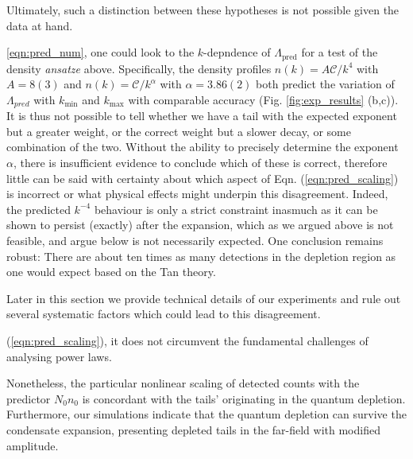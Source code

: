 	Ultimately, such a distinction between these hypotheses is not possible given the data at hand.
	
	\ref{eqn:pred_num}, one could look to the $k$-depndence of $\Lambda_\textrm{pred}$ for a test of the density \emph{ansatze} above.
	Specifically, the density profiles $n(k)=A\mathcal{C}/k^4$ with $A=8(3)$ and $n(k)=\mathcal{C}/k^{\alpha}$ with $\alpha=3.86(2)$ both predict the variation of $\Lambda_{pred}$ with $k_\textrm{min}$ and $k_\textrm{max}$ with comparable accuracy (Fig.
	\ref{fig:exp_results} (b,c)).
	It is thus not possible to tell whether we have a tail with the expected exponent but a greater weight, or the correct weight but a slower decay, or some combination of the two.
	Without the ability to precisely determine the exponent $\alpha$, there is insufficient evidence to conclude which of these is correct, therefore little can be said with certainty about which aspect of Eqn.
	(\ref{eqn:pred_scaling}) is incorrect or what physical effects might underpin this disagreement.
	Indeed, the predicted $k^{-4}$ behaviour is only a strict constraint inasmuch as it can be shown to persist (exactly) after the expansion, which as we argued above is not feasible, and argue below is not necessarily expected.
	One conclusion remains robust: There are about ten times as many detections in the depletion region as one would expect based on the Tan theory.
	
	Later in this section we provide technical details of our experiments and rule out several systematic factors which could lead to this disagreement.

	(\ref{eqn:pred_scaling}), it does not circumvent the fundamental challenges of analysing power laws.
	

	Nonetheless, the particular nonlinear scaling of detected counts with the predictor $N_0n_0$ is concordant with the tails' originating in the quantum depletion.
	Furthermore, our simulations indicate that the quantum depletion can survive the condensate expansion, presenting depleted tails in the far-field with modified amplitude.
	
